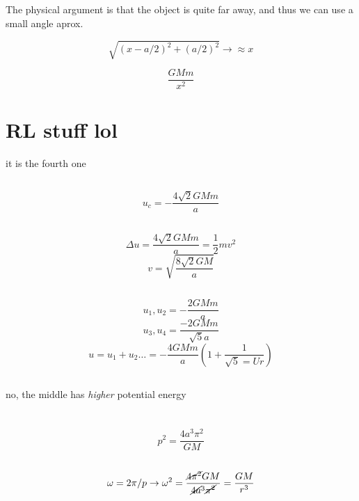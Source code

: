 \subsection{}
    The physical argument is that the object is quite far away, and thus we can use a small angle aprox. 

    \[\sqrt{(x-a/2)^2+(a/2)^2} \rightarrow \approx x\]

    \[{\frac{GMm}{x^2}}\]
\section{RL stuff lol}
    it is the fourth one

    \subsection{}
    \[u_c = -\frac{4\sqrt{2}GMm}{a}\]
    \subsection{}
    \[\Delta u = \frac{4\sqrt{2}GMm}{a} = \frac{1}{2}mv^2\]
    \[v = \sqrt{\frac{8\sqrt{2}GM}{a}}\]
    \subsection{}
    \[u_1, u_2 = -\frac{2GMm}{a}\]
    \[u_3, u_4 = \frac{-2GMm}{\sqrt{5}a}\]
    \[u= u_1 +u_2 \dots = -\frac{4GMm}{a} (1+\frac{1}{\sqrt{5} = Ur})\]

    \subsection{} 
    no, the middle has \textit{higher} potential energy

    \subsection{}

\section{}
    \subsection{}
    \[p^2 = \frac{4a^3\pi^2}{GM}\]
    \subsection{}
    \[\omega = 2\pi/p \rightarrow \omega^2 = \frac{\cancel{4\pi^2} GM}{\cancel{4a}^3\cancel{\pi^2}} = \frac{GM}{r^3}\]
